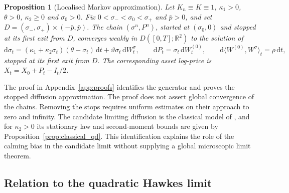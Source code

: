 \documentclass{rQUF2e}
\theoremstyle{plain}
\newtheorem{proposition}[theorem]{Proposition}
\theoremstyle{definition}
\theoremstyle{remark}
\newcommand{\D}{\mathrm{d}}
\begin{document}
\begin{proposition}[Localised Markov approximation]\label{prop:markov}
Let $K_n\equiv K\equiv1$, $\kappa_1>0$, $\theta>0$, $\kappa_2\ge0$ and $\sigma_0>0$. Fix $0<\sigma_-<\sigma_0<\sigma_+$ and $\bar p>0$, and set $D=(\sigma_-,\sigma_+)\times(-\bar p,\bar p)$. The chain $(\sigma^n,P^n)$, started at $(\sigma_0,0)$ and stopped at its first exit from $D$, converges weakly in $D([0,T];\mathbb R^2)$ to the solution of
\begin{equation}\label{eq:markov_limit}
\D\sigma_t=(\kappa_1+\kappa_2\sigma_t)(\theta-\sigma_t)\,\D t+\vartheta\sigma_t\,\D W^\sigma_t,\qquad \D P_t=\sigma_t\,\D W^{(0)}_t,\qquad \D\langle W^{(0)},W^\sigma\rangle_t=\rho\,\D t,
\end{equation}
stopped at its first exit from $D$. The corresponding asset log-price is $X_t=X_0+P_t-I_t/2$.
\end{proposition}

The proof in Appendix~\ref{app:proofs} identifies the generator and proves the stopped diffusion approximation. The proof does not assert global convergence of the chains. Removing the stops requires uniform estimates on their approach to zero and infinity. The candidate limiting diffusion is the classical model of \citet{SeppRakhmonov2023}, and for $\kappa_2>0$ its stationary law and second-moment bounds are given by Proposition~\ref{prop:classical_qd}. This identification explains the role of the calming bias in the candidate limit without supplying a global microscopic limit theorem.

\subsection{Relation to the quadratic Hawkes limit}\label{sec:micro_relation}
\end{document}
